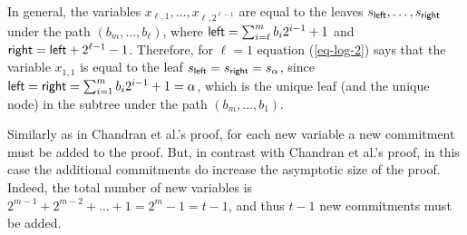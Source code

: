 In general, the variables $x_{\ell,1},\ldots,x_{\ell,2^{\ell-1}}$ are equal to the leaves $s_{{\mathsf{left}}},\ldots,\allowbreak s_{{\mathsf{right}}}$ under the path $(b_m,\ldots, b_\ell)$, where ${\mathsf{left}}=\sum_{i=\ell}^m b_i 2^{i-1}+1$ and ${\mathsf{right}}={\mathsf{left}}+2^{\ell-1}-1$. 
Therefore, for $\ell=1$ equation (\ref{eq-log-2}) says that the variable $x_{1,1}$ is equal to the leaf $s_{{\mathsf{left}}}=s_{{\mathsf{right}}}=s_\alpha$, since ${\mathsf{left}}={\mathsf{right}}=\sum_{i=1}^m b_i2^{i-1}+1=\alpha$, which is the unique leaf (and the unique node) in the subtree under the path $(b_m,\ldots, b_1)$.

Similarly as in Chandran et al.'s proof, for each new variable a new commitment must be added to the proof. But, in contrast with Chandran et al.'s proof, in this case the additional commitments do increase the asymptotic size of the proof. Indeed, the total number of new variables is \(2^{m-1}+2^{m-2}+\ldots+1=2^m-1=t-1\), and thus $t-1$ new commitments must be added.

